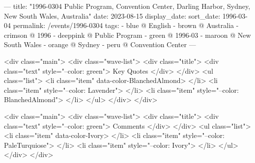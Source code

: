 ---
title: "1996-0304 Public Program, Convention Center, Darling Harbor, Sydney, New South Wales, Australia"
date: 2023-08-15
display_date: 
sort_date: 1996-03-04
permalink: /events/1996-0304
tags:
  - blue @ English
  - brown @ Australia
  - crimson @ 1996
  - deeppink @ Public Program
  - green @ 1996-03
  - maroon @ New South Wales
  - orange @ Sydney
  - peru @ Convention Center
---

<div class="main">
  <div class="wave-list">
    <div class="title">
      <div class="text" style="--color: green">
        Key Quotes
      </div>
    </div>
    <ul class="list">
        <li class="item" data-color-BlanchedAlmond>
        </li>
        <li class="item" style="--color: Lavender">
        </li>
        <li class="item" style="--color: BlanchedAlmond">
        </li>
      </ul>
  </div>
</div>

<div class="main">
  <div class="wave-list">
    <div class="title">
      <div class="text" style="--color: green">
        Comments
      </div>
    </div>
    <ul class="list">
        <li class="item" data-color-Ivory>
        </li>
        <li class="item" style="--color: PaleTurquiose">
        </li>
        <li class="item" style="--color: Ivory">
        </li>
      </ul>
  </div>
</div>